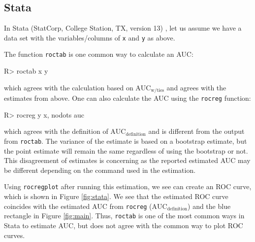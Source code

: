 \documentclass[12pt]{article}
\newenvironment{CodeChunk}{}{}
\begin{document}
\hypertarget{stata}{%
\subsection{Stata}\label{stata}}

In Stata (StatCorp, College Station, TX, version 13) \citep{stata}, let
us assume we have a data set with the variables/columns of \texttt{x}
and \texttt{y} as above.

The function \texttt{roctab} is one common way to calculate an AUC:

\begin{CodeChunk}

\begin{CodeInput}
R> roctab x y
\end{CodeInput}
\end{CodeChunk}

which agrees with the calculation based on
\(\text{AUC}_{\text{w/ties}}\) and agrees with the estimates from above.
One can also calculate the AUC using the \texttt{rocreg} function:

\begin{CodeChunk}

\begin{CodeInput}
R> rocreg y x, nodots auc
\end{CodeInput}
\end{CodeChunk}

which agrees with the definition of \(\text{AUC}_{\text{definition}}\)
and is different from the output from \texttt{roctab}. The variance of
the estimate is based on a bootstrap estimate, but the point estimate
will remain the same regardless of using the bootstrap or not. This
disagreement of estimates is concerning as the reported estimated AUC
may be different depending on the command used in the estimation.

Using \texttt{rocregplot} after running this estimation, we see can
create an ROC curve, which is shown in Figure \ref{fig:stata}. We see
that the estimated ROC curve coincides with the estimated AUC from
\texttt{rocreg} (\(\text{AUC}_{\text{definition}}\)) and the blue
rectangle in Figure \ref{fig:main}. Thus, \texttt{roctab} is one of the
most common ways in Stata to estimate AUC, but does not agree with the
common way to plot ROC curves.
\end{document}
